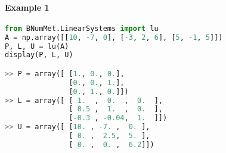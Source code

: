 \paragraph{Example 1}{
\begin{lstlisting}[language=Python]
from BNumMet.LinearSystems import lu
A = np.array([[10, -7, 0], [-3, 2, 6], [5, -1, 5]])
P, L, U = lu(A)
display(P, L, U)

>> P = array([ [1., 0., 0.],
               [0., 0., 1.],
               [0., 1., 0.]])
>> L = array([ [ 1.  ,  0.  ,  0.  ],
               [ 0.5 ,  1.  ,  0.  ],
               [-0.3 , -0.04,  1.  ]])
>> U = array([ [10. , -7. ,  0. ],
               [ 0. ,  2.5,  5. ],
               [ 0. ,  0. ,  6.2]])
           
\end{lstlisting}
}
